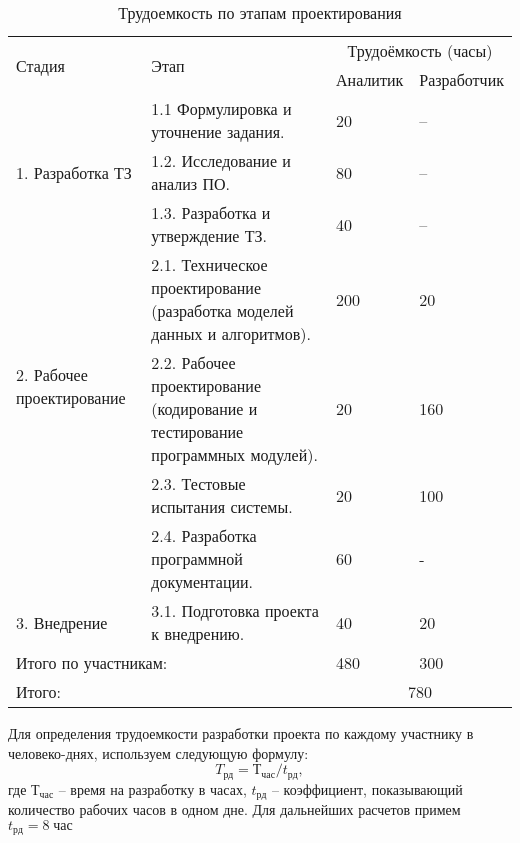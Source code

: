 \begin{table}[!htb]
	\caption{Трудоемкость по этапам проектирования}\label{tab:b}
    \centering
        \begin{tabular}{|p{4cm}|p{5.5cm}|l|l|}
        		\hline
        		\multirow{2}{4cm}{Стадия} & \multirow{2}{*}{Этап} & \multicolumn{2}{c|}{Трудоёмкость (часы)} \\
        		\cline{3-4}
            	& & Аналитик & Разработчик \\
            	\hline	
            	\multirow{3}{*}{1. Разработка ТЗ} 
            						& 1.1 Формулировка и уточнение задания. 
            						& 20 & – \\
            	\cline{2-4}	
                					& 1.2. Исследование и анализ ПО. 
            						& 80 & – \\
            	\cline{2-4}	
            	    					& 1.3. Разработка и утверждение ТЗ. 
            						& 40 & – \\
            	\hline	
            	\multirow{3}{4cm}{2. Рабочее
проектирование
} 
            						& 2.1. Техническое проектирование (разработка моделей данных и алгоритмов).
            						& 200 & 20 \\
            	\cline{2-4}	
                					& 2.2. Рабочее проектирование (кодирование и тестирование программных модулей). 
            						& 20 & 160 \\
            	\cline{2-4}	
            	    					& 2.3. Тестовые испытания системы. 
            						& 20 & 100 \\
            	\cline{2-4}	
            	    					& 2.4. Разработка программной документации.
            						& 60 & - \\						
        		\hline
        		3. Внедрение & 3.1. Подготовка проекта к внедрению. & 40 & 20 \\
        		\hline
        		\multicolumn{2}{|l|}{Итого по участникам:} & 480 & 300 \\
        		\hline
        		\multicolumn{2}{|l|}{Итого:} & \multicolumn{2}{c|}{ 780 } \\
        		\hline
        \end{tabular}   		
\end{table}

Для определения трудоемкости разработки проекта по каждому участнику в человеко-днях, используем следующую формулу: 
$$ T_{рд} = Т_{час}/t_{рд},$$
где $Т_{час}$ – время на разработку в часах, $t_{рд}$ – коэффициент, показывающий количество рабочих часов в одном дне. Для дальнейших расчетов примем $t_{рд} = 8\; час$

